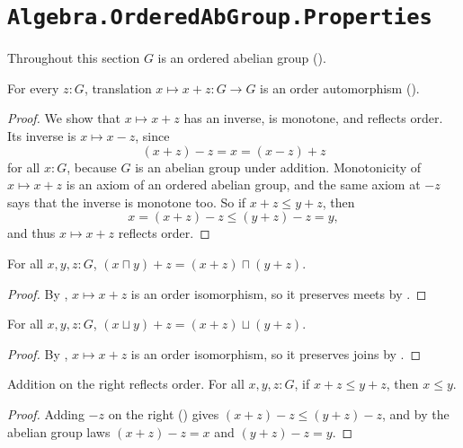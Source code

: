\section{\texttt{Algebra.OrderedAbGroup.Properties}}

Throughout this section $G$ is an ordered abelian group ().

\begin{lemma}
  \label{plusEquivR}
  For every $z : G$, translation $x \mapsto x + z \colon G \to G$ is an order automorphism ().
\end{lemma}
\begin{proof}
  We show that $x \mapsto x + z$ has an inverse, is monotone, and reflects order. Its inverse is $x \mapsto x - z$, since
  \[
    (x + z) - z = x = (x - z) + z
  \]
  for all $x : G$, because $G$ is an abelian group under addition. Monotonicity of $x \mapsto x + z$ is an axiom of an ordered abelian group, and the same axiom at $-z$ says that the inverse is monotone too. So if $x + z \le y + z$, then
  \[
    x = (x + z) - z \le (y + z) - z = y,
  \]
  and thus $x \mapsto x + z$ reflects order.
\end{proof}

\begin{corollary}
  \label{meetTranslate}
  For all $x, y, z : G$, $(x \sqcap y) + z = (x + z) \sqcap (y + z)$.
\end{corollary}
\begin{proof}
  By , $x \mapsto x + z$ is an order isomorphism, so it preserves meets by .
\end{proof}

\begin{corollary}
  \label{joinTranslate}
  For all $x, y, z : G$, $(x \sqcup y) + z = (x + z) \sqcup (y + z)$.
\end{corollary}
\begin{proof}
  By , $x \mapsto x + z$ is an order isomorphism, so it preserves joins by .
\end{proof}

\begin{lemma}
  \label{plusCancelRLe}
  Addition on the right reflects order. For all $x, y, z : G$, if $x + z \le y + z$, then $x \le y$.
\end{lemma}
\begin{proof}
  Adding $-z$ on the right () gives $(x + z) - z \le (y + z) - z$, and by the abelian group laws $(x + z) - z = x$ and $(y + z) - z = y$.
\end{proof}

